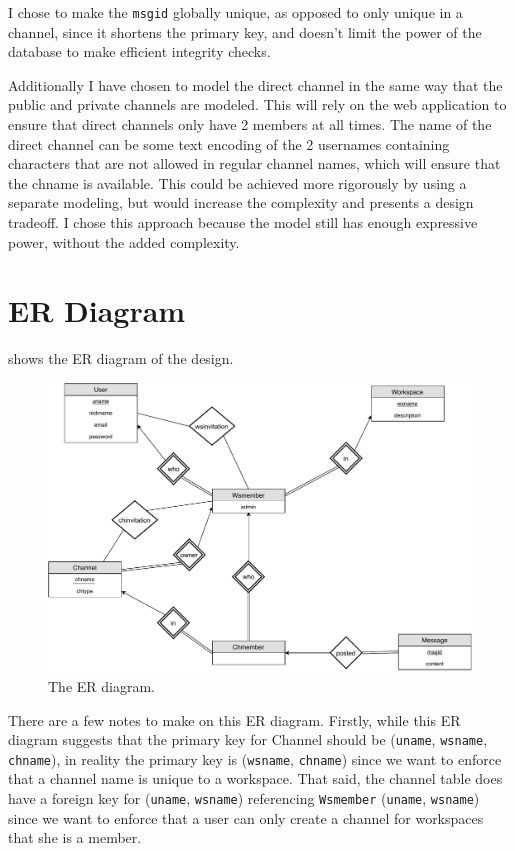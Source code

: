 \documentclass{article}
\newcommand{\ze}{she\xspace}
\begin{document}
I chose to make the \texttt{msgid} globally unique, as opposed to only unique in a channel, since it shortens the primary key, and doesn't limit the power of the database to make efficient integrity checks.

Additionally I have chosen to model the direct channel in the same way that the public and private channels are modeled. This will rely on the web application to ensure that direct channels only have 2 members at all times. The name of the direct channel can be some text encoding of the 2 usernames containing characters that are not allowed in regular channel names, which will ensure that the chname is available. This could be achieved more rigorously by using a separate modeling, but would increase the complexity and presents a design tradeoff. I chose this approach because the model still has enough expressive power, without the added complexity.

\section{ER Diagram}

 shows the ER diagram of the design.

 \begin{figure}[!ht]
 	\centering
 	\includegraphics[width=0.9\linewidth]{dber}
 	\caption{The ER diagram.}
 	\label{fig:er}
\end{figure}

There are a few notes to make on this ER diagram. Firstly, while this ER diagram suggests that the primary key for Channel should be (\texttt{uname}, \texttt{wsname}, \texttt{chname}), in reality the primary key is (\texttt{wsname}, \texttt{chname}) since we want to enforce that a channel name is unique to a workspace. That said, the channel table does have a foreign key for (\texttt{uname}, \texttt{wsname}) referencing \texttt{Wsmember} (\texttt{uname}, \texttt{wsname}) since we want to enforce that a user can only create a channel for workspaces that \ze is a member.
\end{document}
